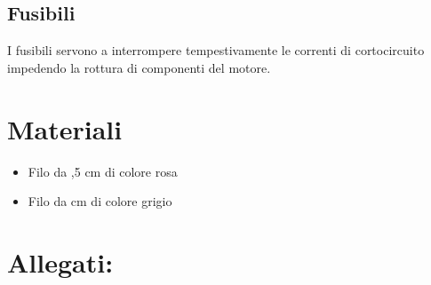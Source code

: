 \documentclass[12pt]{article}
\begin{document}
\subsection*{Fusibili}
I fusibili servono a interrompere tempestivamente le correnti di cortocircuito impedendo la rottura di componenti del motore.
\section{Materiali}
\begin{itemize}
    \item Filo da ,5 cm  di colore rosa
    \item Filo da  cm  di colore grigio
\end{itemize}
\section{Allegati:}
\newpage
\end{document}

